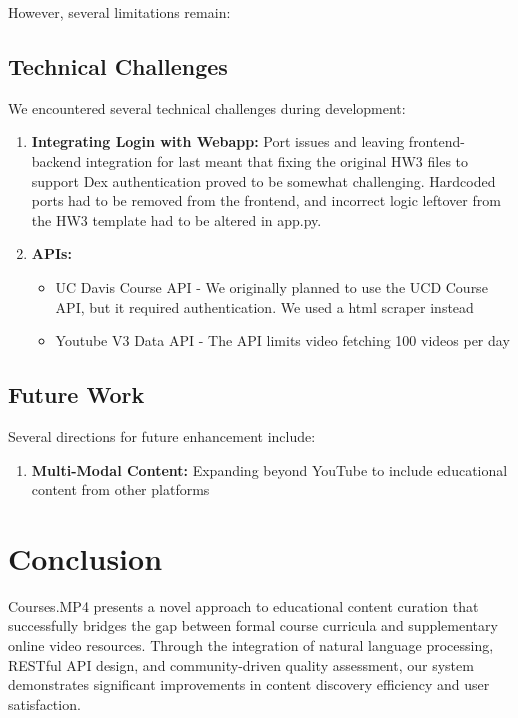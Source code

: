 \documentclass[manuscript,nonacm]{acmart}
\begin{document}
However, several limitations remain:

\subsection{Technical Challenges}

We encountered several technical challenges during development:
\begin{enumerate}
    \item \textbf{Integrating Login with Webapp:} Port issues and leaving frontend-backend integration for last meant that fixing the original HW3 files to support Dex authentication proved to be somewhat challenging. Hardcoded ports had to be removed from the frontend, and incorrect logic leftover from the HW3 template had to be altered in app.py.
    \item \textbf{APIs:}
    \begin{itemize}
        \item UC Davis Course API - We originally planned to use the UCD Course API, but it required authentication. We used a html scraper instead
        \item Youtube V3 Data API - The API limits video fetching 100 videos per day
    \end{itemize}
\end{enumerate}

\subsection{Future Work}

Several directions for future enhancement include:

\begin{enumerate}
    \item \textbf{Multi-Modal Content:} Expanding beyond YouTube to include educational content from other platforms
\end{enumerate}

\section{Conclusion}

Courses.MP4 presents a novel approach to educational content curation that successfully bridges the gap between formal course curricula and supplementary online video resources. Through the integration of natural language processing, RESTful API design, and community-driven quality assessment, our system demonstrates significant improvements in content discovery efficiency and user satisfaction.
\end{document}
